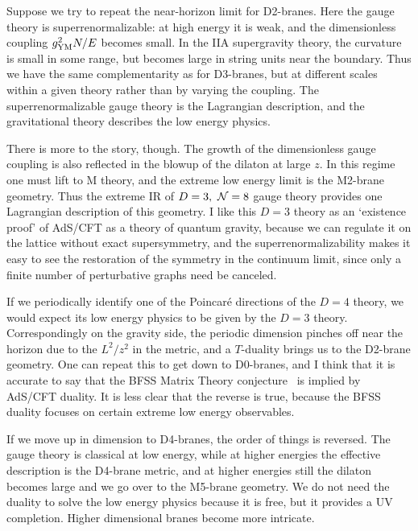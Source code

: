 \documentclass[12pt]{article}
\begin{document}
{Suppose we try to repeat the near-horizon limit for D2-branes.  Here the gauge theory is superrenormalizable: at high energy it is weak, and the dimensionless coupling $g_{\rm YM}^2 N /{ E}$ becomes small.  In the IIA supergravity theory, the curvature is small in some range, but becomes large in string units near the boundary.  Thus we have the same complementarity as for D3-branes, but at different scales within a given theory rather than by varying the coupling.  The superrenormalizable gauge theory is the Lagrangian description, and the gravitational theory describes the low energy physics.  

There is more to the story, though.  The growth of the dimensionless gauge coupling is also reflected in the blowup of the dilaton at large $z$.  In this regime one must lift to M theory, and the extreme low energy limit is the M2-brane geometry.  Thus the extreme IR of $D=3,\ {\cal N}=8$ gauge theory provides one Lagrangian description of this geometry.  I like this $D=3$ theory as an `existence proof' of AdS/CFT as a theory of quantum gravity, because we can regulate it on the lattice without exact supersymmetry, and the superrenormalizability makes it easy to see the restoration of the symmetry in the continuum limit, since only a finite number of perturbative graphs need be canceled.

If we periodically identify one of the Poincar\'e directions of the $D=4$ theory, we would expect its low energy physics to be given by the $D=3$ theory.  Correspondingly on the gravity side, the periodic dimension pinches off near the horizon due to the $L^2/z^2$ in the metric, and a $T$-duality brings us to the D2-brane geometry.  One can repeat this to get down to D0-branes, and I think that it is accurate to say that the BFSS Matrix Theory conjecture~\cite{Banks:1996vh} is implied by AdS/CFT duality.  It is less clear that the reverse is true, because the BFSS duality focuses on certain extreme low energy observables.

If we move up in dimension to D4-branes, the order of things is reversed.  The gauge theory is classical at low energy, while at higher energies the effective description is the D4-brane metric, and at higher energies still the dilaton becomes large and we go over to the M5-brane geometry.  We do not need the duality to solve the low energy physics because it is free, but it provides a UV completion.  Higher dimensional branes become more intricate.

}
\end{document}
